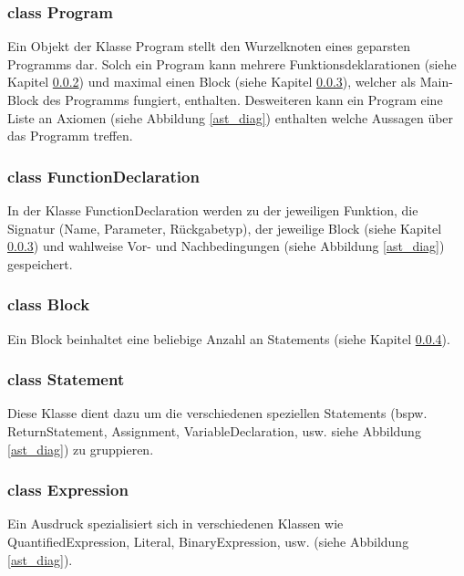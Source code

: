 \begin{landscape}
\subsubsection{class Program}
Ein Objekt der Klasse Program stellt den Wurzelknoten eines geparsten Programms dar. Solch ein Program kann mehrere Funktionsdeklarationen (siehe Kapitel \ref{astfunctiondecl_class}) und maximal einen Block (siehe Kapitel \ref{astblock_class}), welcher als Main-Block des Programms fungiert, enthalten. Desweiteren kann ein Program eine Liste an Axiomen (siehe Abbildung \ref{ast_diag}) enthalten welche Aussagen über das Programm treffen.

\subsubsection{class FunctionDeclaration}
\label{astfunctiondecl_class}
In der Klasse FunctionDeclaration werden zu der jeweiligen Funktion, die Signatur (Name, Parameter, Rückgabetyp), der jeweilige Block (siehe Kapitel \ref{astblock_class}) und wahlweise Vor- und Nachbedingungen (siehe Abbildung \ref{ast_diag}) gespeichert.

\subsubsection{class Block}
\label{astblock_class}
Ein Block beinhaltet eine beliebige Anzahl an Statements (siehe Kapitel \ref{aststatement_class}).

\subsubsection{class Statement}
\label{aststatement_class}
Diese Klasse dient dazu um die verschiedenen speziellen Statements (bspw. ReturnStatement, Assignment, VariableDeclaration, usw. siehe Abbildung \ref{ast_diag}) zu gruppieren.

\subsubsection{class Expression}
\label{astexpr_class}
Ein Ausdruck spezialisiert sich in verschiedenen Klassen wie QuantifiedExpression, Literal, BinaryExpression, usw. (siehe Abbildung \ref{ast_diag}).


\end{landscape}
